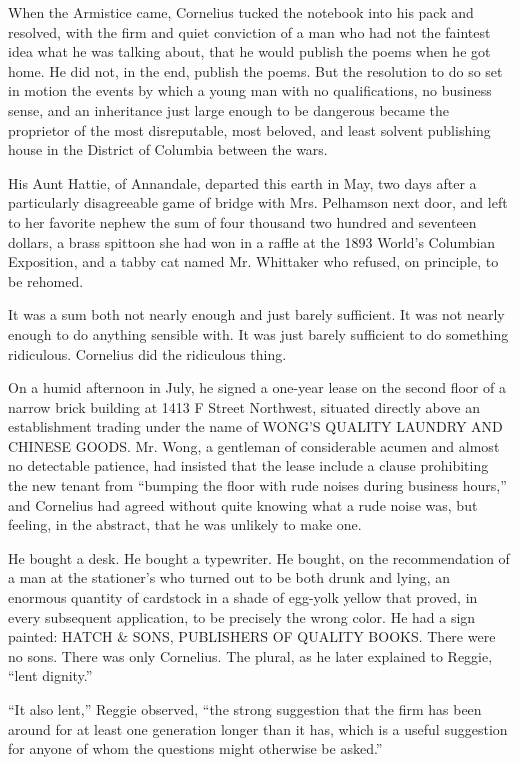 \documentclass[12pt,openright]{book}
\begin{document}
When the Armistice came, Cornelius tucked the notebook into his pack and resolved, with the firm and quiet conviction of a man who had not the faintest idea what he was talking about, that he would publish the poems when he got home. He did not, in the end, publish the poems. But the resolution to do so set in motion the events by which a young man with no qualifications, no business sense, and an inheritance just large enough to be dangerous became the proprietor of the most disreputable, most beloved, and least solvent publishing house in the District of Columbia between the wars.

His Aunt Hattie, of Annandale, departed this earth in May, two days after a particularly disagreeable game of bridge with Mrs. Pelhamson next door, and left to her favorite nephew the sum of four thousand two hundred and seventeen dollars, a brass spittoon she had won in a raffle at the 1893 World’s Columbian Exposition, and a tabby cat named Mr. Whittaker who refused, on principle, to be rehomed.

It was a sum both not nearly enough and just barely sufficient. It was not nearly enough to do anything sensible with. It was just barely sufficient to do something ridiculous. Cornelius did the ridiculous thing.

On a humid afternoon in July, he signed a one-year lease on the second floor of a narrow brick building at 1413 F Street Northwest, situated directly above an establishment trading under the name of WONG’S QUALITY LAUNDRY AND CHINESE GOODS. Mr. Wong, a gentleman of considerable acumen and almost no detectable patience, had insisted that the lease include a clause prohibiting the new tenant from “bumping the floor with rude noises during business hours,” and Cornelius had agreed without quite knowing what a rude noise was, but feeling, in the abstract, that he was unlikely to make one.

He bought a desk. He bought a typewriter. He bought, on the recommendation of a man at the stationer’s who turned out to be both drunk and lying, an enormous quantity of cardstock in a shade of egg-yolk yellow that proved, in every subsequent application, to be precisely the wrong color. He had a sign painted: HATCH \& SONS, PUBLISHERS OF QUALITY BOOKS. There were no sons. There was only Cornelius. The plural, as he later explained to Reggie, “lent dignity.”

“It also lent,” Reggie observed, “the strong suggestion that the firm has been around for at least one generation longer than it has, which is a useful suggestion for anyone of whom the questions might otherwise be asked.”
\end{document}
